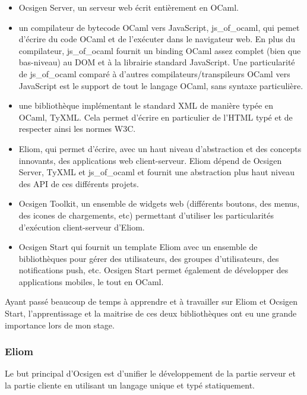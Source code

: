\begin{itemize}
  \item Ocsigen Server\cite{ocsigen-server-github}, un serveur web écrit entièrement en OCaml.
  \item un compilateur de bytecode OCaml vers JavaScript, js\_of\_ocaml\cite{ocsigen-js-of-ocaml-github}, qui
    pemet d'écrire du code OCaml et de l'exécuter dans le navigateur web. En
plus du compilateur, js\_of\_ocaml fournit un binding OCaml assez complet (bien
que bas-niveau) au DOM et à la librairie standard JavaScript. Une particularité
de js\_of\_ocaml comparé à d'autres compilateurs/transpileurs OCaml vers
JavaScript est le support de tout le langage OCaml, sans syntaxe particulière.
  \item une bibliothèque implémentant le standard XML de manière typée en OCaml,
TyXML\cite{ocsigen-tyxml-github}. Cela permet d'écrire en particulier de l'HTML
typé et de respecter ainsi les normes W3C.
  \item Eliom, qui permet d'écrire, avec un haut niveau
    d'abstraction et des concepts innovants, des applications web
client-serveur. Eliom dépend de Ocsigen Server, TyXML et js\_of\_ocaml et
fournit une abstraction plus haut niveau des API de ces différents projets.
  \item Ocsigen Toolkit, un ensemble de widgets web (différents boutons, des
    menus, des icones de chargements, etc) permettant d'utiliser les
    particularités d'exécution client-serveur d'Eliom.
  \item Ocsigen Start qui fournit un template Eliom avec un ensemble de
    bibliothèques pour gérer des utilisateurs, des groupes d'utilisateurs, des
    notifications push, etc. Ocsigen Start permet également de développer des
    applications mobiles, le tout en OCaml.
\end{itemize}

Ayant passé beaucoup de temps à apprendre et à travailler sur Eliom et Ocsigen
Start, l'apprentissage et la maitrise de ces deux bibliothèques ont eu une
grande importance lors de mon stage. 

\subsubsection{Eliom}

Le but principal d'Ocsigen est d'unifier le développement de la partie serveur
et la partie cliente en utilisant un langage unique et typé statiquement.

